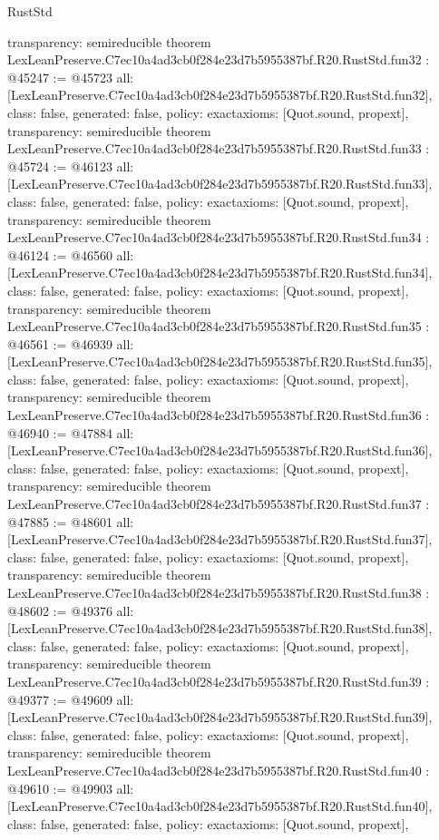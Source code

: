 \begin{lexlean}{RustStd}
\begin{coremodule}
{  transparency: semireducible
}
theorem LexLeanPreserve.C7ec10a4ad3cb0f284e23d7b5955387bf.R20.RustStd.fun32 : @45247 := @45723 {
  all: [LexLeanPreserve.C7ec10a4ad3cb0f284e23d7b5955387bf.R20.RustStd.fun32],
  class: false,
  generated: false,
  policy: exact{axioms: [Quot.sound, propext]},
  transparency: semireducible
}
theorem LexLeanPreserve.C7ec10a4ad3cb0f284e23d7b5955387bf.R20.RustStd.fun33 : @45724 := @46123 {
  all: [LexLeanPreserve.C7ec10a4ad3cb0f284e23d7b5955387bf.R20.RustStd.fun33],
  class: false,
  generated: false,
  policy: exact{axioms: [Quot.sound, propext]},
  transparency: semireducible
}
theorem LexLeanPreserve.C7ec10a4ad3cb0f284e23d7b5955387bf.R20.RustStd.fun34 : @46124 := @46560 {
  all: [LexLeanPreserve.C7ec10a4ad3cb0f284e23d7b5955387bf.R20.RustStd.fun34],
  class: false,
  generated: false,
  policy: exact{axioms: [Quot.sound, propext]},
  transparency: semireducible
}
theorem LexLeanPreserve.C7ec10a4ad3cb0f284e23d7b5955387bf.R20.RustStd.fun35 : @46561 := @46939 {
  all: [LexLeanPreserve.C7ec10a4ad3cb0f284e23d7b5955387bf.R20.RustStd.fun35],
  class: false,
  generated: false,
  policy: exact{axioms: [Quot.sound, propext]},
  transparency: semireducible
}
theorem LexLeanPreserve.C7ec10a4ad3cb0f284e23d7b5955387bf.R20.RustStd.fun36 : @46940 := @47884 {
  all: [LexLeanPreserve.C7ec10a4ad3cb0f284e23d7b5955387bf.R20.RustStd.fun36],
  class: false,
  generated: false,
  policy: exact{axioms: [Quot.sound, propext]},
  transparency: semireducible
}
theorem LexLeanPreserve.C7ec10a4ad3cb0f284e23d7b5955387bf.R20.RustStd.fun37 : @47885 := @48601 {
  all: [LexLeanPreserve.C7ec10a4ad3cb0f284e23d7b5955387bf.R20.RustStd.fun37],
  class: false,
  generated: false,
  policy: exact{axioms: [Quot.sound, propext]},
  transparency: semireducible
}
theorem LexLeanPreserve.C7ec10a4ad3cb0f284e23d7b5955387bf.R20.RustStd.fun38 : @48602 := @49376 {
  all: [LexLeanPreserve.C7ec10a4ad3cb0f284e23d7b5955387bf.R20.RustStd.fun38],
  class: false,
  generated: false,
  policy: exact{axioms: [Quot.sound, propext]},
  transparency: semireducible
}
theorem LexLeanPreserve.C7ec10a4ad3cb0f284e23d7b5955387bf.R20.RustStd.fun39 : @49377 := @49609 {
  all: [LexLeanPreserve.C7ec10a4ad3cb0f284e23d7b5955387bf.R20.RustStd.fun39],
  class: false,
  generated: false,
  policy: exact{axioms: [Quot.sound, propext]},
  transparency: semireducible
}
theorem LexLeanPreserve.C7ec10a4ad3cb0f284e23d7b5955387bf.R20.RustStd.fun40 : @49610 := @49903 {
  all: [LexLeanPreserve.C7ec10a4ad3cb0f284e23d7b5955387bf.R20.RustStd.fun40],
  class: false,
  generated: false,
  policy: exact{axioms: [Quot.sound, propext]},
}
\end{coremodule}
\end{lexlean}
